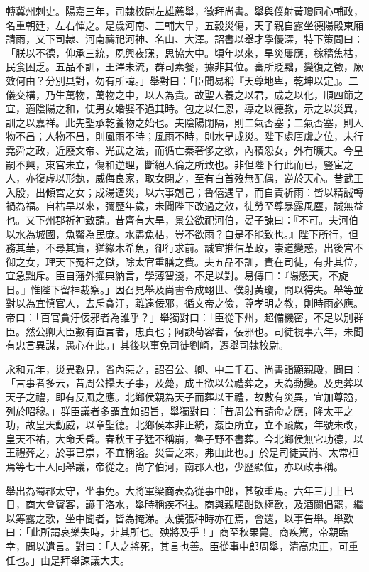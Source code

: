 \begin{pinyinscope}
轉冀州刺史。陽嘉三年，司隸校尉左雄薦舉，徵拜尚書。舉與僕射黃瓊同心輔政，名重朝廷，左右憚之。是歲河南、三輔大旱，五穀災傷，天子親自露坐德陽殿東廂請雨，又下司隸、河南禱祀河神、名山、大澤。詔書以舉才學優深，特下策問曰：「朕以不德，仰承三統，夙興夜寐，思協大中。頃年以來，旱災屢應，稼穡焦枯，民食困乏。五品不訓，王澤未流，群司素餐，據非其位。審所貶黜，變復之徵，厥效何由？分別具對，勿有所諱。」舉對曰：「臣聞易稱『天尊地卑，乾坤以定』。二儀交構，乃生萬物，萬物之中，以人為貴。故聖人養之以君，成之以化，順四節之宜，適陰陽之和，使男女婚娶不過其時。包之以仁恩，導之以德教，示之以災異，訓之以嘉祥。此先聖承乾養物之始也。夫陰陽閉隔，則二氣否塞；二氣否塞，則人物不昌；人物不昌，則風雨不時；風雨不時，則水旱成災。陛下處唐虞之位，未行堯舜之政，近廢文帝、光武之法，而循亡秦奢侈之欲，內積怨女，外有曠夫。今皇嗣不興，東宮未立，傷和逆理，斷絕人倫之所致也。非但陛下行此而已，豎宦之人，亦復虛以形埶，威侮良家，取女閉之，至有白首歿無配偶，逆於天心。昔武王入殷，出傾宮之女；成湯遭災，以六事剋己；魯僖遇旱，而自責祈雨：皆以精誠轉禍為福。自枯旱以來，彌歷年歲，未聞陛下改過之效，徒勞至尊暴露風塵，誠無益也。又下州郡祈神致請。昔齊有大旱，景公欲祀河伯，晏子諫曰：『不可。夫河伯以水為城國，魚鱉為民庶。水盡魚枯，豈不欲雨？自是不能致也。』陛下所行，但務其華，不尋其實，猶緣木希魚，卻行求前。誠宜推信革政，崇道變惑，出後宮不御之女，理天下冤枉之獄，除太官重膳之費。夫五品不訓，責在司徒，有非其位，宜急黜斥。臣自藩外擢典納言，學薄智淺，不足以對。易傳曰：『陽感天，不旋日。』惟陛下留神裁察。」因召見舉及尚書令成翊世、僕射黃瓊，問以得失。舉等並對以為宜慎官人，去斥貪汙，離遠佞邪，循文帝之儉，尊孝明之教，則時雨必應。帝曰：「百官貪汙佞邪者為誰乎？」舉獨對曰：「臣從下州，超備機密，不足以別群臣。然公卿大臣數有直言者，忠貞也；阿諛苟容者，佞邪也。司徒視事六年，未聞有忠言異謀，愚心在此。」其後以事免司徒劉崎，遷舉司隸校尉。

永和元年，災異數見，省內惡之，詔召公、卿、中二千石、尚書詣顯親殿，問曰：「言事者多云，昔周公攝天子事，及薨，成王欲以公禮葬之，天為動變。及更葬以天子之禮，即有反風之應。北鄉侯親為天子而葬以王禮，故數有災異，宜加尊謚，列於昭穆。」群臣議者多謂宜如詔旨，舉獨對曰：「昔周公有請命之應，隆太平之功，故皇天動威，以章聖德。北鄉侯本非正統，姦臣所立，立不踰歲，年號未改，皇天不祐，大命夭昏。春秋王子猛不稱崩，魯子野不書葬。今北鄉侯無它功德，以王禮葬之，於事已崇，不宜稱謚。災眚之來，弗由此也。」於是司徒黃尚、太常桓焉等七十人同舉議，帝從之。尚字伯河，南郡人也，少歷顯位，亦以政事稱。

舉出為蜀郡太守，坐事免。大將軍梁商表為從事中郎，甚敬重焉。六年三月上巳日，商大會賓客，讌于洛水，舉時稱疾不往。商與親暱酣飲極歡，及酒闌倡罷，繼以筹露之歌，坐中聞者，皆為掩涕。太僕張种時亦在焉，會還，以事告舉。舉歎曰：「此所謂哀樂失時，非其所也。殃將及乎！」商至秋果薨。商疾篤，帝親臨幸，問以遺言。對曰：「人之將死，其言也善。臣從事中郎周舉，清高忠正，可重任也。」由是拜舉諫議大夫。


\end{pinyinscope}
